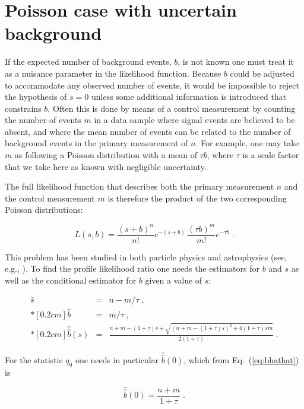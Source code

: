 \documentclass[11pt]{article}
\begin{document}
\section{Poisson case with uncertain background}
\label{sec:bunknown}

If the expected number of background events, $b$, is not known one
must treat it as a nuisance parameter in the likelihood function.
Because $b$ could be adjusted to accommodate any observed number of
events, it would be impossible to reject the hypothesis of $s=0$
unless some additional information is introduced that constrains $b$.
Often this is done by means of a control measurement by counting the
number of events $m$ in a data sample where signal events are believed
to be absent, and where the mean number of events can be related to
the number of background events in the primary measurement of $n$.
For example, one may take $m$ as following a Poisson distribution with
a mean of $\tau b$, where $\tau$ is a scale factor that we take here
as known with negligible uncertainty.

The full likelihood function that describes both the primary measurement
$n$ and the control measurement $m$ is therefore the product of
the two corresponding Poisson distributions:

\begin{equation}
\label{eq:onoffL}
L(s,b) = \frac{(s+b)^n}{n!} e^{-(s+b)} \, 
\frac{(\tau b)^m}{m!} e^{-\tau b} \;.
\end{equation}

\noindent This problem has been studied in both particle physics and
astrophysics (see, e.g., \cite{asimov,LiMa83,Cranmer05,Cousins08}).
To find the profile likelihood ratio one needs the estimators for $b$
and $s$ as well as the conditional estimator for $b$ given a value of
$s$:

\begin{eqnarray}
\label{eq:shat}
\hat{s} & = & n - m/\tau \;, \\*[0.2 cm]
\label{eq:bhat}
\hat{b} & = & m/\tau \;, \\*[0.2 cm]
\label{eq:bhathat}
\hat{\hat{b}}(s) & = & \frac{ n + m - (1 + \tau) s + 
\sqrt{ (n + m - (1+\tau)s)^2 + 4 (1+\tau) s m } }{ 2 (1 + \tau) } \;.
\end{eqnarray}

\noindent For the statistic $q_0$ one needs in particular $\hat{\hat{b}}(0)$,
which from Eq.~(\ref{eq:bhathat}) is

\begin{equation}
\label{eq:bhathat0}
\hat{\hat{b}}(0) = \frac{n + m}{1 + \tau} \;.
\end{equation}
\end{document}
